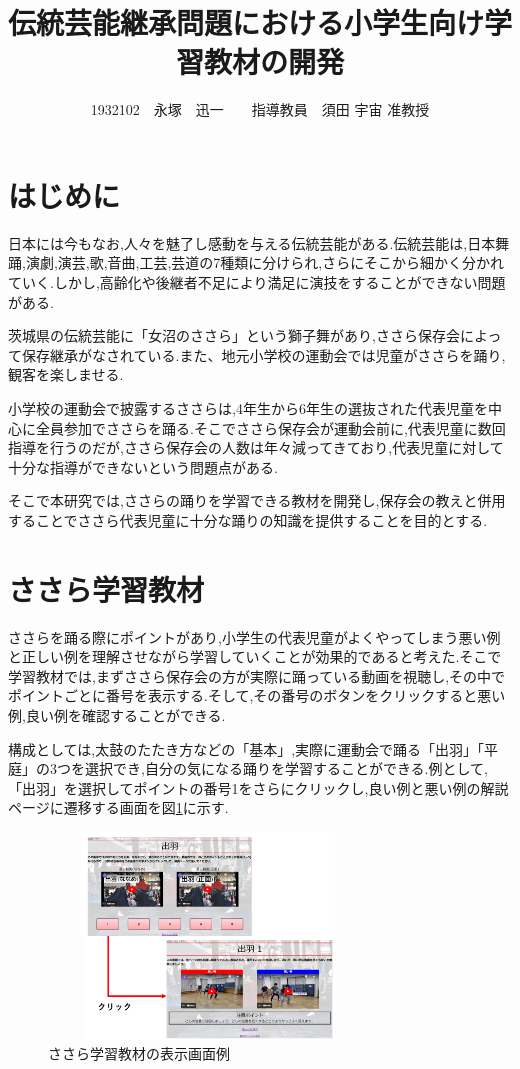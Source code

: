 \documentclass[twocolumn,10pt,a4j]{ltjsarticle}
\title{伝統芸能継承問題における小学生向け学習教材の開発}
\author{1932102　永塚　迅一　　指導教員　須田 宇宙 准教授}
\date{}
\begin{document}
\maketitle
\section{はじめに}


日本には今もなお,人々を魅了し感動を与える伝統芸能がある.伝統芸能は,日本舞踊,演劇,演芸,歌,音曲,工芸,芸道の7種類に分けられ,さらにそこから細かく分かれていく.しかし,高齢化や後継者不足により満足に演技をすることができない問題がある.

茨城県の伝統芸能に「女沼のささら」という獅子舞があり,ささら保存会によって保存継承がなされている.また、地元小学校の運動会では児童がささらを踊り,観客を楽しませる.

小学校の運動会で披露するささらは,4年生から6年生の選抜された代表児童を中心に全員参加でささらを踊る.そこでささら保存会が運動会前に,代表児童に数回指導を行うのだが,ささら保存会の人数は年々減ってきており,代表児童に対して十分な指導ができないという問題点がある.

そこで本研究では,ささらの踊りを学習できる教材を開発し,保存会の教えと併用することでささら代表児童に十分な踊りの知識を提供することを目的とする.

\section{ささら学習教材}
ささらを踊る際にポイントがあり,小学生の代表児童がよくやってしまう悪い例と正しい例を理解させながら学習していくことが効果的であると考えた.そこで学習教材では,まずささら保存会の方が実際に踊っている動画を視聴し,その中でポイントごとに番号を表示する.そして,その番号のボタンをクリックすると悪い例,良い例を確認することができる.

構成としては,太鼓のたたき方などの「基本」,実際に運動会で踊る「出羽」「平庭」の3つを選択でき,自分の気になる踊りを学習することができる.例として,「出羽」を選択してポイントの番号1をさらにクリックし,良い例と悪い例の解説ページに遷移する画面を図\ref{fig:ささら}に示す.
\begin{figure}[h]
\begin{center}
 \includegraphics[clip,width=85mm,height=55mm]{figures/kyouzai12.png}
\end{center}
 \caption{ささら学習教材の表示画面例}
 \label{fig:ささら}
\end{figure}
\end{document}
